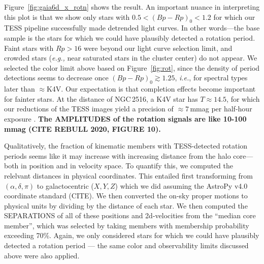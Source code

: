 \documentclass[12pt,twocolumn,tighten]{aastex63}
\begin{document}
Figure~\ref{fig:gaia6d_x_rotn} shows the result.  An important nuance
in interpreting this plot is that we show only stars with
$0.5<(Bp-Rp)_0<1.2$ for which our TESS pipeline successfully made
detrended light curves.  In other words---the base sample is the stars
for which we could have plausibly detected a rotation period.  Faint
stars with $Rp>16$ were beyond our light curve selection limit, and
crowded stars ({\it e.g.,} near saturated stars in the cluster center)
do not appear.  We selected the color limit above based on
Figure~\ref{fig:rot}, since the density of period detections seems to
decrease once $(Bp-Rp)_0 \gtrsim 1.25$, {\it i.e.}, for spectral types
later than $\approx$K4V.
Our expectation is that completion effects become important for
fainter stars.
At the distance of NGC\,2516, a K4V star has $T\approx 14.5$,
for which our reductions of the TESS images yield a precision of
$\approx 7$\,mmag per half-hour exposure \citep{bouma_wasp4b_2019}.
{\bf 
The AMPLITUDES of the rotation signals are like 10-100 mmag (CITE
REBULL 2020, FIGURE 10).
}




Qualitatively, the fraction of kinematic members with TESS-detected rotation 
periods seems like it may increase with increasing distance from the halo core---both in
position and in velocity space.
To quantify this, we computed the relelvant distances in physical coordinates.
This entailed first transforming from $(\alpha, \delta, \pi)$ to galactocentric ($X,Y,Z$) which we did 
assuming the AstroPy v4.0 coordinate standard (CITE).
We then converted the on-sky proper motions to physical units by dividing by the distance of each star.
We then computed the SEPARATIONS of all of these positions and
2d-velocities from the ``median core member'', which was selected by
taking  members with membership
probability exceeding 70\%.
Again, we only considered stars for which we could have plausibly
detected a rotation period --- the same color and observability limits
discussed above were also applied.
\end{document}
